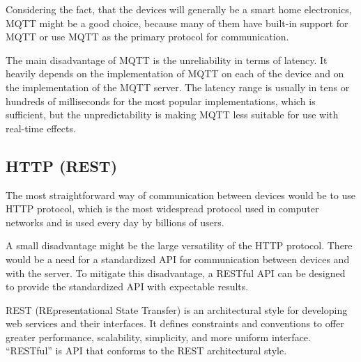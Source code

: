Considering the fact, that the devices will generally be a smart home
electronics, MQTT might be a good choice, because many of them have built-in
support for MQTT or use MQTT as the primary protocol for communication.


The main disadvantage of MQTT is the unreliability in terms of latency.
It heavily depends on the implementation of MQTT on each of the device and on
the implementation of the MQTT server. The latency range is usually
in tens or hundreds of milliseconds for the most popular implementations,
\cite{mqttlat} which is sufficient, but the unpredictability is making MQTT
less suitable for use with real-time effects.


\subsection{HTTP (REST)}
The most straightforward way of communication between devices would be to use
HTTP protocol, which is the most widespread protocol used in computer networks
and is used every day by billions of users. \cite{httpsrv}


A small disadvantage might be the large versatility of the HTTP protocol. There would be
a need for a standardized API for communication between devices and with the
server. To mitigate this disadvantage, a RESTful API can be designed to provide
the standardized API with expectable results.


REST (REpresentational State Transfer) is an architectural style for developing
web services and their interfaces. It defines constraints and conventions to
offer greater performance, scalability, simplicity, and more uniform interface.
\cite{restdef} ``RESTful'' is API that conforms to the REST architectural style.
